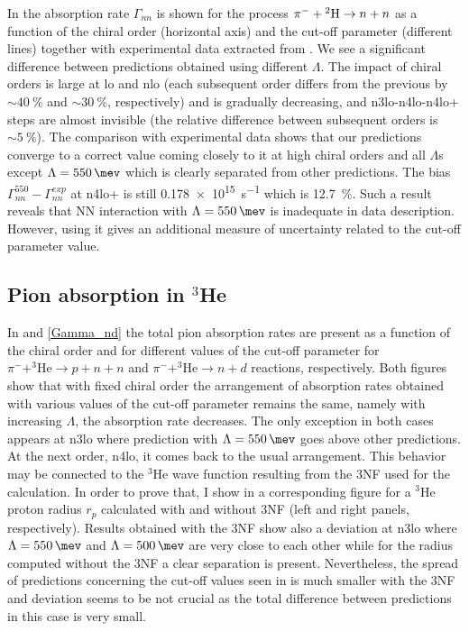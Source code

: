     In  the absorption rate $\Gamma_{nn}$ is shown for the process $\pi^- + {^2{\rm H}} \rightarrow n + n$
    as a function of the chiral order (horizontal axis) and the cut-off parameter (different lines) 
    together with experimental data extracted from \cite{Strauch2010,Strauch2011}.
    We see a significant difference between
    predictions obtained using different $\Lambda$. The impact of chiral orders is large at \gls{lo}
    and \gls{nlo} (each subsequent order differs from the previous 
    by $\sim\SI{40}{\percent}$ and $\sim\SI{30}{\percent}$, respectively) 
    and is gradually decreasing, and \gls{n3lo}-\gls{n4lo}-\gls{n4lo+} steps are almost invisible
    (the relative difference between subsequent orders is $\sim\SI{5}{\percent}$).
    The comparison with experimental data shows that our predictions converge to a correct value coming 
    closely to it at high chiral orders and all $\Lambda$s except $\Lambda = \SI{550}{\mev}$ 
    which is clearly separated from other predictions. The bias $\Gamma^{550}_{nn} - \Gamma^{exp}_{nn}$
    at \gls{n4lo+} is still \SI{0.178e15}{s^{-1}} which is \SI{12.7}{\percent}.
    Such a result reveals that NN interaction with $\Lambda = \SI{550}{\mev}$  is inadequate in data description. 
    However, using it gives an additional measure of uncertainty related to the cut-off parameter value.


    \subsection{Pion absorption in $^3$He}
    
    In  and \ref{Gamma_nd} the total pion absorption rates are present as a function
    of the chiral order and for different values of the cut-off parameter
    for $\pi^- + ^3\text{He} \rightarrow p + n + n$ 
    and $\pi^- + ^3\text{He} \rightarrow n + d$ reactions, respectively.
    Both figures show that with fixed chiral order the arrangement 
    of absorption rates obtained with various values of the cut-off parameter
    remains the same, namely with increasing $\Lambda$, the absorption rate decreases. The only exception in both cases 
    appears at \gls{n3lo} where prediction with $\Lambda = \SI{550}{\mev}$ goes above other predictions.
    At the next order, \gls{n4lo}, it comes back to the usual arrangement.
    This behavior may be connected to the $^3$He wave function resulting from the
    3NF used for the calculation.
    In order to prove that, I show in 
    a corresponding figure for a $^3$He proton radius $r_p$ calculated with 
    and without 3NF (left and right panels, respectively). Results obtained with the 3NF show
    also a deviation at \gls{n3lo} where $\Lambda=\SI{550}{\mev}$ and $\Lambda=\SI{500}{\mev}$ are 
    very close to each other while for the radius computed without the 3NF a clear separation is present.
    Nevertheless, the spread of predictions concerning
    the cut-off values seen in  is much smaller
    with the 3NF and deviation seems to be not crucial as the total difference
    between predictions in this case is very small.

